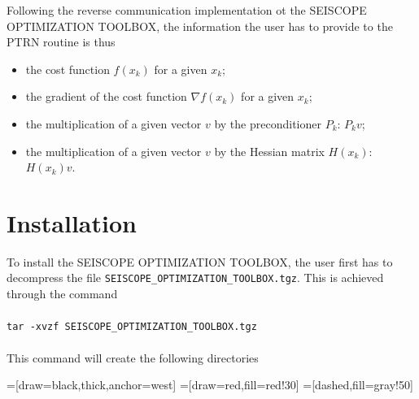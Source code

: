 \documentclass[a4paper,twoside,final,onecolumn,11pt,openright]{article}
\begin{document}
Following the reverse communication implementation ot the SEISCOPE OPTIMIZATION TOOLBOX, the information the user has to provide to the PTRN routine is thus 
\begin{itemize}
 \item the cost function $f(x_k)$ for  a given $x_k$;
 \item the gradient of the cost function $\nabla f(x_k)$ for  a given $x_k$;
 \item the multiplication of a given vector $v$ by the preconditioner $P_k$: $P_kv$;
 \item the multiplication of a given vector $v$ by the Hessian matrix $H(x_k)$: $H(x_k)v$.
\end{itemize}

\newpage
\section{Installation}

To install the SEISCOPE OPTIMIZATION TOOLBOX, the user first has to decompress the file \texttt{SEISCOPE\_OPTIMIZATION\_TOOLBOX.tgz}. This is achieved through the command
\\
\\
\texttt{tar -xvzf SEISCOPE\_OPTIMIZATION\_TOOLBOX.tgz}
\\
\\
This command will create the following directories

\vspace{0.5cm}
=[draw=black,thick,anchor=west]
=[draw=red,fill=red!30]
=[dashed,fill=gray!50]
 
\end{document}
